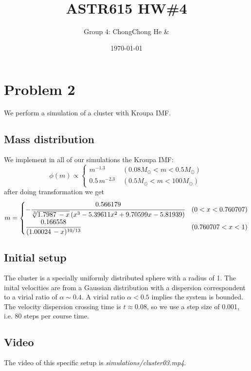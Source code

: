 



\title{ASTR615 HW\#4}
\author{Group 4: ChongChong He \& }
\date{\today}
\maketitle

\section*{Problem 2}
We perform a simulation of a cluster with Kroupa IMF.
\subsection*{Mass distribution}
We implement in all of our simulations the Kroupa IMF:
\begin{equation}
\phi(m) \propto 
\begin{cases}
m^{-1.3} \; &(0.08M_\odot < m < 0.5M_\odot) \\
0.5 \, m^{-2.3} \; &(0.5M_\odot<m<100M_\odot)
\end{cases}
\end{equation}
after doing transformation we get
\begin{equation}
m=
	\begin{cases}
	-\cfrac{0.566179}{\sqrt[3]{1.7987\, - x} \left(x^3-5.39611 
	x^2+9.70599 x-5.81939\right)} & (0<x<0.760707)\\
	\cfrac{0.166558}{(1.00024\, -x)^{10/13}} & (0.760707<x<1)
	\end{cases}
\end{equation}

\subsection*{Initial setup}
The cluster is a specially uniformly distributed sphere with a radius of 1. The inital 
velocities are from a  Gaussian distribution with a dispersion correspondent to a virial ratio 
of $ \alpha \sim 0.4 $. A virial ratio $ \alpha < 0.5 $ implies the system is bounded. The 
velocity dispersion crossing time is $ t \approx 0.08 $, so we use a step size of 0.001, i.e. 
80 steps per course time.

\subsection{Video}
The video of this specific setup is \textit{simulations/cluster03.mp4}.

